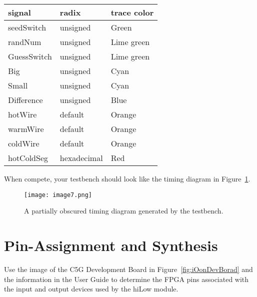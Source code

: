   \begin{tabular}{p{4cm}p{4cm}p{4cm}}
   signal & radix & trace color \\ \hline
    seedSwitch  &  unsigned & Green  \\
    randNum  &  unsigned  & Lime green  \\
    GuessSwitch  &  unsigned  & Lime green  \\
    Big   & unsigned &  Cyan  \\
    Small  &  unsigned &  Cyan  \\
    Difference  &  unsigned &  Blue  \\
    hotWire  & default &  Orange  \\
    warmWire  & default &  Orange  \\
    coldWire  & default &  Orange  \\
    hotColdSeg  & hexadecimal &  Red  \\
\end{tabular}

When compete, your testbench should look like the timing diagram in
Figure~\ref{fig:guessTiming}.

\begin{figure}[ht]
\texttt{[image:  image7.png]}
\caption{A partially obscured timing diagram generated by the testbench.}
\label{fig:guessTiming}
\end{figure}




\section{Pin-Assignment and Synthesis}

Use the image of the C5G Development Board in Figure~\ref{fig:iOonDevBorad} and the information
in the User Guide to determine the FPGA pins associated with the input
and output devices used by the hiLow module.

